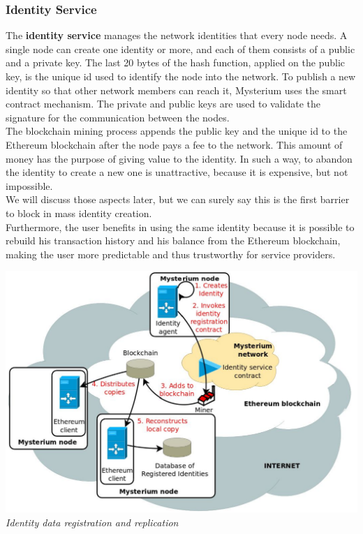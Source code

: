 \documentclass[12pt]{article}
\begin{document}
	\subsubsection{Identity Service}
	The \textbf{identity service} manages the network identities that every node needs. A single node can create one identity or more, and each of them consists of a public and a private key. The last 20 bytes of the hash function, applied on the public key, is the unique id used to identify the node into the network. To publish a new identity so that other network members can reach it, Mysterium uses the smart contract mechanism. The private and public keys are used to validate the signature for the communication between the nodes.\\
	The blockchain mining process appends the public key and the unique id to the Ethereum blockchain after the node pays a fee to the network. This amount of money has the purpose of giving value to the identity. In such a way,  to abandon the identity to create a new one is unattractive, because it is expensive, but not impossible.\\ 
	We will discuss those aspects later, but we can surely say this is the first barrier to block in mass identity creation.\\
	Furthermore, the user benefits in using the same identity because it is possible to rebuild his transaction history and his balance from the Ethereum blockchain, making the user more predictable and thus trustworthy for service providers.\\

	\bigbreak
	\begin{center}
		\includegraphics[width=1\linewidth]{images/mysterium_identity_creation.png}
		\small{\textit{Identity data registration and replication}}
	\end{center}
\end{document}
